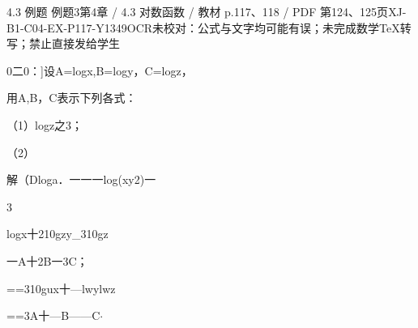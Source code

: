 \begin{bankitem}{4.3 例题 例题3}{第4章 / 4.3 对数函数 / 教材 p.117、118 / PDF 第124、125页}{XJ-B1-C04-EX-P117-Y1349}{OCR未校对：公式与文字均可能有误；未完成数学TeX转写；禁止直接发给学生}
\begin{ocrdraft}
\par
0二0：]设A=logx,B=logy，C=logz，
\par
用A,B，C表示下列各式：
\par
（1）logz之3；
\par
（2）
\par
解（Dloga．一一一log(xy2)一
\par
3
\par
logx十210gzy\_310gz
\par
一A十2B一3C；
\par
[教材p.118 / PDF第125页]
\par
==310gux十—lwylwz
\par
==3A十—B——C\ensuremath{\cdot}
\end{ocrdraft}
\end{bankitem}
